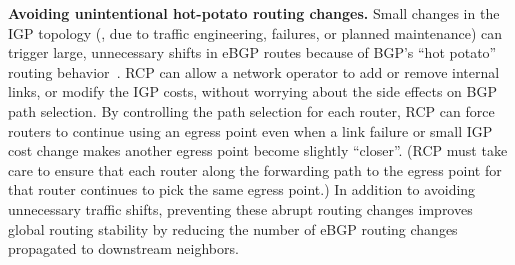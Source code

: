 
{\bf Avoiding unintentional hot-potato routing changes.}  Small
changes in the IGP topology (\eg, due to traffic engineering,
failures, or planned maintenance) can trigger large, unnecessary
shifts in eBGP routes because of BGP's ``hot potato'' routing
behavior~\cite{teixeira2004b}.  RCP can allow a network operator to add
or remove internal links, or modify the IGP costs, without worrying
about the side effects on BGP path selection.  By controlling the path
selection for each router, RCP can force routers to continue using an
egress point even when a link failure or small IGP cost change makes
another egress point become slightly ``closer''.  (RCP must take care
to ensure that each router along the forwarding path to the egress
point for that router continues to pick the same egress point.)  In
addition to avoiding unnecessary traffic shifts,
preventing these abrupt routing changes improves global
routing stability by reducing the number of eBGP routing changes
propagated to downstream neighbors.

